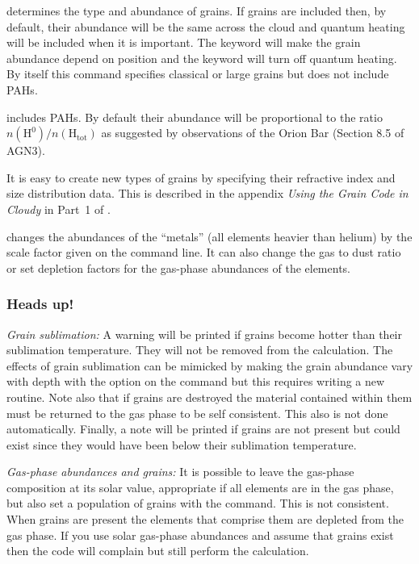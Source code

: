 \documentclass[12pt,twoside]{article}
\begin{document}
{ determines the type
\label{command:grains}
and abundance of grains.  If grains are
included then, by default, their abundance will be the same across the cloud
and quantum heating will be included when it is important.   The
keyword will make the grain abundance depend on position and the
keyword will turn off quantum heating.  By itself this command specifies
classical or large grains but does not include PAHs.

 includes PAHs.  By default
their abundance will be proportional
to the ratio $n(\mathrm{H}^0)/n(\mathrm{H}_\mathrm{tot})$
as suggested by observations of the Orion Bar (Section 8.5 of AGN3).

It is easy to create new types of grains by specifying their refractive index
and size distribution data.
This is described in the appendix \emph{Using the Grain Code in Cloudy} in Part~1 of \Hazy.

 changes the abundances
\label{command:metals}
of the ``metals'' (all elements heavier
than helium) by the scale factor given on the command line.  It can also
change the gas to dust ratio or set depletion factors for the gas-phase
abundances of the elements.

\subsubsection{Heads up!}

\emph{Grain sublimation:} A warning will be printed if grains become hotter
than their sublimation temperature.  They will not be removed from the
calculation.  The effects of grain sublimation can be mimicked by making
the grain abundance vary with depth with the
 option on the 
command but this requires writing a new routine.  Note also that if grains
are destroyed the material contained within them must be returned to the
gas phase to be self consistent.  This also is not done automatically.
Finally, a note will be printed if grains are not present but could exist
since they would have been below their sublimation temperature.

\emph{Gas-phase abundances and grains:}
It is possible to leave the gas-phase
composition at its solar value, appropriate if all elements are in the gas
phase, but also set a population of grains
with the  command.  This
is not consistent.  When grains are present the elements that comprise them
are depleted from the gas phase.  If you use solar gas-phase abundances
and assume that grains exist then the code will complain but still perform
the calculation.

}
\end{document}

